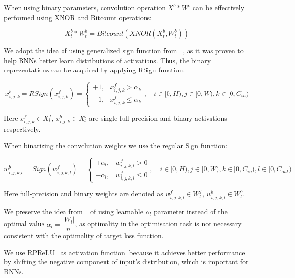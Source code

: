 \documentclass{article}
\begin{document}
When using binary parameters, convolution operation $X^b \ast W^b$ can be effectively performed using XNOR and Bitcount operations:

\begin{equation*}
    X_t^b \ast W_t^b = Bitcount(XNOR(X_t^b, W_t^b))
\end{equation*}

We adopt the idea of using generalized sign function from ~\cite{liu2020reactnet}, as it was proven to help BNNs better learn distributions of activations. Thus, the binary representations can be acquired by applying RSign function:

\begin{equation}
    x_{i, j, k}^b = RSign(x_{i, j, k}^f) = 
    \begin{cases}
        +1, & x_{i, j, k}^f > \alpha_k \\
        -1, & x_{i, j, k}^f \le \alpha_k 
    \end{cases}, \quad
    i \in [0, H), j \in [0, W), k \in [0, C_{in})
\label{eq_act_sign}
\end{equation}

Here $x_{i, j, k}^f \in X_t^f$, $x_{i, j, k}^b \in X_t^b$ are single full-precision and binary activations respectively.

When binarizing the convolution weights we use the regular Sign function:

\begin{equation}
    w_{i, j, k, l}^b = Sign(w_{i, j, k, l}^f) = 
    \begin{cases}
        +\alpha_l, & w_{i, j, k, l}^f > 0 \\
        -\alpha_l, & w_{i, j, k, l}^f \le 0
    \end{cases}, \quad
    i \in [0, H), j \in [0, W), k \in [0, C_{in}), l \in [0, C_{out})
\end{equation}

Here full-precision and binary weights are denoted as $w_{i, j, k, l}^f \in W_t^f$, $w_{i, j, k, l}^b \in W_t^b$.

We preserve the idea from ~\cite{ma2019efficient} of using learnable $\alpha_l$ parameter instead of the optimal value $\alpha_l = \dfrac{|W_l|}{n}$, as optimality in the optimisation task is not necessary consistent with the optimality of target loss function.

We use RPReLU~\cite{liu2020reactnet} as activation function, because it achieves better performance by shifting the negative component of input's distribution, which is important for BNNs.
\end{document}
